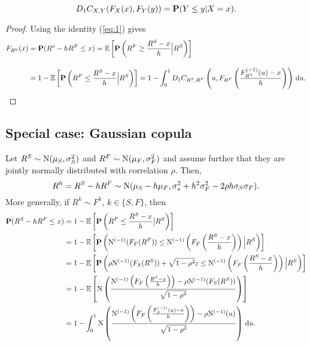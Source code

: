 \documentclass[square]{article} %
\theoremstyle{plain}
\theoremstyle{definition} %
\begin{document}
\begin{equation}
  \label{eq:1}
  D_1 C_{X,Y}(F_X(x), F_Y(y)) = {\bf P}(Y\leq y|X=x).
\end{equation}
\begin{proof}
  Using the identity (\ref{eq:1}) gives
  \begin{align*}
    F_{R^h}(x) &= \p(R^s - h R^F\leq x) %
                 = \E\left[\p\left(R^F\geq \frac{R^S-x}{h}\Big|
                 R^S\right)\right]\\[10pt]
               &= 1-\E\left[\p\left(R^F\leq \frac{R^S-x}{h}\Big|
                 R^S\right)\right]%
               = 1- \int_0^1 D_1 C_{R^S, R^F}\left(u,
                 F_{R^F}\left(\frac{F^{(-1)}_{R^S}(u) -
                 x}{h}\right)\right)\, \dd u.
  \end{align*}
\end{proof}

\subsection{Special case: Gaussian copula}
\label{sec:spec-case:-gauss}

Let $R^S\sim {\rm N}(\mu_S, \sigma_S^2)$ and $R^F\sim {\rm N}(\mu_F,
\sigma_F^2)$ and assume further that they are jointly normally
distributed with correlation $\rho$. Then,
\begin{equation*}
  R^h = R^S - h R^F \sim {\rm N}(\mu_S - h \mu_F, \sigma_s^2 + h^2
  \sigma_F^2 - 2\rho h \sigma_S \sigma_F).
\end{equation*}
More generally, if $R^k\sim F^k$, $k\in \{S,F\}$, then
\begin{align*}
  \p(R^S-h R^F\leq x)
  &= 1-\E\left[ \p\left(R^F\leq \frac{R^S-x}{h}\big| R^S\right)\right] \\ %
  &= 1-\E\left[\p \left(\Ncdf^{(-1)}(F_F(R^F)) \leq
    \Ncdf^{(-1)}\left(F_F\left(\frac{R^S-x}{h}\right)\right) \Big|
    R^S\right)\right] \\%
  &= 1-\E\left[ \p\left(\rho \Ncdf^{(-1)}(F_S(R^S)) + \sqrt{1-\rho^2}
    \varepsilon \leq \Ncdf^{(-1)}\left(F_F\left(\frac{R^S-x}{h}\right)\right) \Big|
    R^S\right)\right]\\ %
  &= 1-\E\left[ \Ncdf \left(
    \frac{\Ncdf^{(-1)}\left(F_F\left(\frac{R^S-x}{h}\right)\right) -\rho
    \Ncdf^{(-1)}(F_S(R^S))} { \sqrt{1-\rho^2}}\right)\right]\\
  &= 1-\int_0^1  \Ncdf \left(
    \frac{\Ncdf^{(-1)}\left(F_F\left(\frac{F_S^{(-1)}(u)-x}{h}\right)\right) -\rho
    \Ncdf^{(-1)}(u)} { \sqrt{1-\rho^2}}\right) \,\dd u.
\end{align*}
\end{document}
